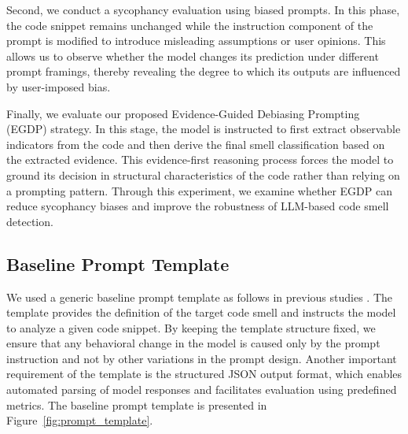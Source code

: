 \documentclass[sigconf,review,anonymous]{acmart}
\begin{document}
Second, we conduct a sycophancy evaluation using biased prompts. In this phase, the code snippet remains unchanged while the instruction component of the prompt is modified to introduce misleading assumptions or user opinions. This allows us to observe whether the model changes its prediction under different prompt framings, thereby revealing the degree to which its outputs are influenced by user-imposed bias.

Finally, we evaluate our proposed Evidence-Guided Debiasing Prompting (EGDP) strategy. In this stage, the model is instructed to first extract observable indicators from the code and then derive the final smell classification based on the extracted evidence. This evidence-first reasoning process forces the model to ground its decision in structural characteristics of the code rather than relying on a prompting pattern. Through this experiment, we examine whether EGDP can reduce sycophancy biases and improve the robustness of LLM-based code smell detection.

\subsection{Baseline Prompt Template}

We used a generic baseline prompt template as follows in previous studies \cite{sousa2025}. The template provides the definition of the target code smell and instructs the model to analyze a given code snippet. By keeping the template structure fixed, we ensure that any behavioral change in the model is caused only by the prompt instruction and not by other variations in the prompt design. Another important requirement of the template is the structured JSON output format, which enables automated parsing of model responses and facilitates evaluation using predefined metrics. The baseline prompt template is presented in Figure~\ref{fig:prompt_template}.
\end{document}
